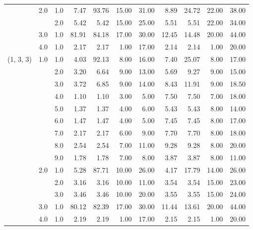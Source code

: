\begin{tabular}{lllrrrrrrrr}
          & 2.0 & 1.0  &       7.47 &     93.76 & 15.00 &  31.00 &       8.89 &     24.72 & 22.00 &  38.00 \\
          &     & 2.0  &       5.42 &      5.42 & 15.00 &  25.00 &       5.51 &      5.51 & 22.00 &  34.00 \\
          & 3.0 & 1.0  &      81.91 &     84.18 & 17.00 &  30.00 &      12.45 &     14.48 & 20.00 &  44.00 \\
          & 4.0 & 1.0  &       2.17 &      2.17 &  1.00 &  17.00 &       2.14 &      2.14 &  1.00 &  20.00 \\
(1, 3, 3) & 1.0 & 1.0  &       4.03 &     92.13 &  8.00 &  16.00 &       7.40 &     25.07 &  8.00 &  17.00 \\
          &     & 2.0  &       3.20 &      6.64 &  9.00 &  13.00 &       5.69 &      9.27 &  9.00 &  15.00 \\
          &     & 3.0  &       3.72 &      6.85 &  9.00 &  14.00 &       8.43 &     11.91 &  9.00 &  18.50 \\
          &     & 4.0  &       1.10 &      1.10 &  3.00 &   5.00 &       7.50 &      7.50 &  7.00 &  18.00 \\
          &     & 5.0  &       1.37 &      1.37 &  4.00 &   6.00 &       5.43 &      5.43 &  8.00 &  14.00 \\
          &     & 6.0  &       1.47 &      1.47 &  4.00 &   5.00 &       7.45 &      7.45 &  8.00 &  17.00 \\
          &     & 7.0  &       2.17 &      2.17 &  6.00 &   9.00 &       7.70 &      7.70 &  8.00 &  18.00 \\
          &     & 8.0  &       2.54 &      2.54 &  7.00 &  11.00 &       9.28 &      9.28 &  8.00 &  20.00 \\
          &     & 9.0  &       1.78 &      1.78 &  7.00 &   8.00 &       3.87 &      3.87 &  8.00 &  11.00 \\
          & 2.0 & 1.0  &       5.28 &     87.71 & 10.00 &  26.00 &       4.17 &     17.79 & 14.00 &  26.00 \\
          &     & 2.0  &       3.16 &      3.16 & 10.00 &  11.00 &       3.54 &      3.54 & 15.00 &  23.00 \\
          &     & 3.0  &       3.46 &      3.46 & 10.00 &  20.00 &       3.55 &      3.55 & 15.00 &  24.00 \\
          & 3.0 & 1.0  &      80.12 &     82.39 & 17.00 &  30.00 &      11.44 &     13.61 & 20.00 &  44.00 \\
          & 4.0 & 1.0  &       2.19 &      2.19 &  1.00 &  17.00 &       2.15 &      2.15 &  1.00 &  20.00 \\

\end{tabular}
